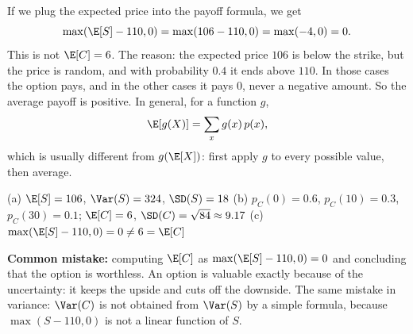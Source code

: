 \begin{solution}
	 If we plug the expected price into the payoff formula, we get
	\[ \max(\E[S]-110,0)=\max(106-110,0)=\max(-4,0)=0. \]
	This is not $\E[C]=6$. The reason: the expected price $106$ is below the
	strike, but the price is random, and with probability $0.4$ it ends above
	$110$. In those cases the option pays, and in the other cases it pays $0$,
	never a negative amount. So the average payoff is positive. In general,
	for a function $g$,
	\[ \E[g(X)]=\sum_x g(x)\,p(x), \]
	which is usually different from $g(\E[X])$: first apply $g$ to every
	possible value, then average.
	\begin{answer}
		(a) $\E[S]=106$, $\Var(S)=324$, $\SD(S)=18$ \quad
		(b) $p_C(0)=0.6$, $p_C(10)=0.3$, $p_C(30)=0.1$; $\E[C]=6$,
		$\SD(C)=\sqrt{84}\approx9.17$ \quad
		(c) $\max(\E[S]-110,0)=0\neq6=\E[C]$
	\end{answer}
	\begin{remark}
		\textbf{Common mistake:} computing $\E[C]$ as $\max(\E[S]-110,0)=0$ and
		concluding that the option is worthless. An option is valuable exactly
		because of the uncertainty: it keeps the upside and cuts off the
		downside. The same mistake in variance: $\Var(C)$ is not obtained from
		$\Var(S)$ by a simple formula, because $\max(S-110,0)$ is not a linear
		function of $S$.
	\end{remark}
\end{solution}
